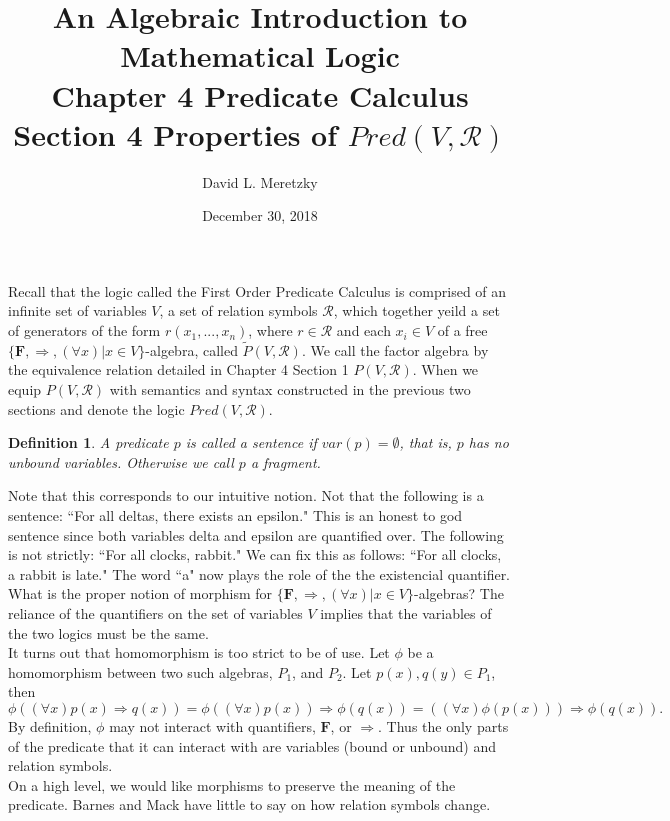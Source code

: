\documentclass{article}
\title{ \vspace{-10ex} %
An Algebraic Introduction to Mathematical Logic\\
Chapter 4 Predicate Calculus \\
Section 4 Properties of $Pred(V, \mathscr{R})$ \\
}
\author{David L. Meretzky
}
\date{%
December 30, 2018
}
\theoremstyle{problemstyle}
\theoremstyle{lemmastyle}
\theoremstyle{theoremstyle}
\theoremstyle{problemstyle}
\newtheorem{definition}{Definition}
\begin{document}
\maketitle

Recall that the logic called the First Order Predicate Calculus is comprised of an infinite set of variables $V$, a set of relation symbols $\mathscr{R}$, which together yeild a set of generators of the form $r(x_1,...,x_n)$, where $r \in \mathscr{R}$ and each $x_i \in V$ of a free $\{\textbf{F}, \Rightarrow, (\forall x) | x \in V\}$-algebra, called $\widetilde{P}(V,\mathscr{R})$. We call the factor algebra by the equivalence relation detailed in Chapter 4 Section 1 $P(V,\mathscr{R})$. When we equip $P(V,\mathscr{R})$ with semantics and syntax constructed in the previous two sections and denote the logic $Pred(V,\mathscr{R})$. 

\begin{definition}
A predicate $p$ is called a sentence if $var(p) = \emptyset$, that is, $p$ has no unbound variables. Otherwise we call $p$ a fragment. 
\end{definition}

Note that this corresponds to our intuitive notion. Not that the following is a sentence: ``For all deltas, there exists an epsilon." This is an honest to god sentence since both variables delta and epsilon are quantified over. The following is not strictly: ``For all clocks, rabbit." We can fix this as follows: ``For all clocks, a rabbit is late." The word ``a" now plays the role of the the existencial quantifier. \\

What is the proper notion of morphism for $\{\textbf{F}, \Rightarrow, (\forall x) | x \in V\}$-algebras? The reliance of the quantifiers on the set of variables $V$ implies that the variables of the two logics must be the same.\\

It turns out that homomorphism is too strict to be of use. Let $\phi$ be a homomorphism between two such algebras, $P_1$, and $P_2$. Let $p(x),q(y) \in P_1$, then $$\phi((\forall x)p(x) \Rightarrow q(x)) =\phi((\forall x)p(x)) \Rightarrow \phi(q(x)) =  ((\forall x)\phi(p(x))) \Rightarrow \phi(q(x)).$$ By definition, $\phi$ may not interact with quantifiers, $\textbf{F}$, or $\Rightarrow$. Thus the only parts of the predicate that it can interact with are variables (bound or unbound) and relation symbols.\\

On a high level, we would like morphisms to preserve the meaning of the predicate. Barnes and Mack have little to say on how relation symbols change.\\
\end{document}
